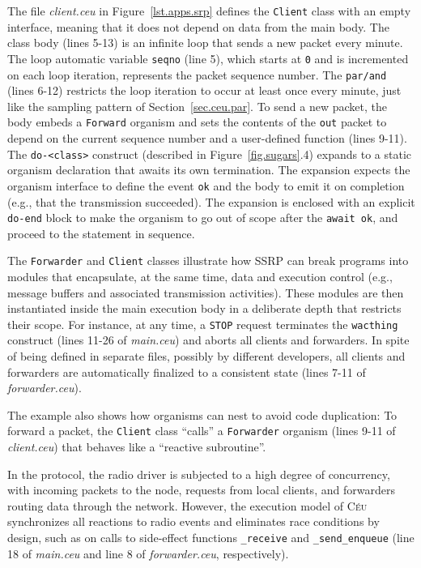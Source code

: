 \documentclass[preprint]{sigplanconf}
\newcommand{\CEU}{\textsc{C\'{e}u}\xspace}
\newcommand{\code}[1] {{\small{\texttt{#1}}}}
\newcommand{\1}{\;}
\newcommand{\2}{\;\;}
\newcommand{\3}{\;\;\;}
\newcommand{\5}{\;\;\;\;\;}
\begin{document}
The file \emph{client.ceu} in Figure~\ref{lst.apps.srp} defines the 
\code{Client} class with an empty interface, meaning that it does not depend on 
data from the main body.
%
The class body (lines 5-13) is an infinite loop that sends a new packet
every minute.
The loop automatic variable \code{seqno} (line 5), which starts at \code{0} and 
is incremented on each loop iteration, represents the packet sequence number.
%
The \code{par/and} (lines 6-12) restricts the loop iteration to occur at least 
once every minute, just like the sampling pattern of Section~\ref{sec.ceu.par}.
%
To send a new packet, the body embeds a \code{Forward} organism and sets the 
contents of the \code{out} packet to depend on the current sequence number and 
a user-defined function (lines 9-11).
The \code{do-<class>} construct (described in Figure~\ref{fig.sugars}.4) 
expands to a static organism declaration that awaits its own termination.
%
The expansion expects the organism interface to define the event \code{ok} and 
the body to emit it on completion (e.g., that the transmission succeeded).
The expansion is enclosed with an explicit \code{do-end} block to make the 
organism to go out of scope after the \code{await ok}, and proceed to the 
statement in sequence.

The \code{Forwarder} and \code{Client} classes illustrate how SSRP can break 
programs into modules that encapsulate, at the same time, data and execution 
control (e.g., message buffers and associated transmission activities).
%
These modules are then instantiated inside the main execution body in a 
deliberate depth that restricts their scope.
%
For instance, at any time, a \code{STOP} request terminates the \code{wacthing} 
construct (lines 11-26 of \emph{main.ceu}) and aborts all clients and 
forwarders.
%
In spite of being defined in separate files, possibly by different developers, 
all clients and forwarders are automatically finalized to a consistent state 
(lines 7-11 of \emph{forwarder.ceu}).

The example also shows how organisms can nest to avoid code duplication:
To forward a packet, the \code{Client} class ``calls'' a \code{Forwarder} 
organism (lines 9-11 of \emph{client.ceu}) that behaves like a ``reactive 
subroutine''.

In the protocol, the radio driver is subjected to a high degree of concurrency, 
with incoming packets to the node, requests from local clients, and forwarders 
routing data through the network.
However, the execution model of \CEU synchronizes all reactions to radio events 
and eliminates race conditions by design, such as on calls to side-effect 
functions \code{\_receive} and \code{\_send\_enqueue} (line 18 of 
\emph{main.ceu} and line 8 of \emph{forwarder.ceu}, respectively).
\end{document}
